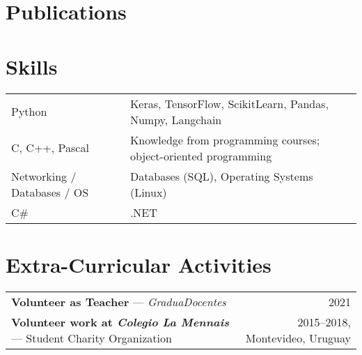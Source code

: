 \documentclass[a4paper,12pt]{article}
\begin{document}
\section{Publications}
\begin{refsection}
\nocite{*}
\printbibliography[heading=none]
\end{refsection}

\section{Skills}
\begin{tabularx}{\linewidth}{@{}l X@{}}
Python & \normalsize{Keras, TensorFlow, ScikitLearn, Pandas, Numpy, Langchain}\\
C, C++, Pascal & \normalsize{Knowledge from programming courses; object-oriented programming}\\
Networking / Databases / OS & \normalsize{Databases (SQL), Operating Systems (Linux)}\\
C\# & \normalsize{.NET}\\
\end{tabularx}

\section{Extra-Curricular Activities}
\begin{tabularx}{\linewidth}{@{}l r@{}} 
\textbf{Volunteer as Teacher} — \textit{GraduaDocentes} & \hfill 2021 \\[3.75pt]
\textbf{Volunteer work at \textit{Colegio La Mennais}} — Student Charity Organization & \hfill 2015--2018, Montevideo, Uruguay \\
\end{tabularx}

\end{document}
